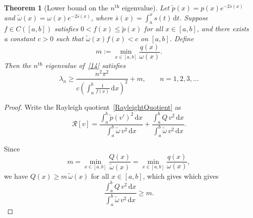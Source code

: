 \documentclass[11pt, reqno]{amsart}
\numberwithin{equation}{section}  %
\theoremstyle{plain}
\newtheorem{theorem}{Theorem}[section]
\theoremstyle{definition}
\theoremstyle{remark}
\begin{document}
\begin{theorem}[Lower bound on the $n^{\text{th}}$ eigenvalue]
\label{th:lower-bound}
Let $\tilde{p}(x) = p(x)e^{-2\bar{s}(x)}$ and $\tilde{\omega}(x) = \omega(x)e^{-2\bar{s}(x)}$, where $\bar{s}(x) = \int_a^x s(t)\,\mathrm{d}t$. Suppose $f \in C([a,b])$ satisfies $0 < f(x) \leq \tilde{p}(x)$ for all $x \in [a,b]$, and there exists a constant $c > 0$ such that $\tilde{\omega}(x)f(x) < c$ on $[a,b]$. Define
\[
m := \min_{x \in [a,b]} \frac{q(x)}{\omega(x)}.
\]
Then the $n^{\text{th}}$ eigenvalue of~\eqref{14} satisfies
\[
\lambda_n \geq \frac{n^2\pi^2}{c\left(\displaystyle\int_a^b \frac{1}{f(x)}\,\mathrm{d}x\right)^2} + m, \qquad n = 1, 2, 3, \ldots
\]
\end{theorem}

\begin{proof}
Write the Rayleigh quotient~\eqref{RayleightQuotient} as
\[
\mathcal{R}[v] = \frac{\displaystyle\int_a^b \tilde{p}(v')^2\,\mathrm{d}x}{\displaystyle\int_a^b \tilde{\omega}\,v^2\,\mathrm{d}x} + \frac{\displaystyle\int_a^b Q\,v^2\,\mathrm{d}x}{\displaystyle\int_a^b \tilde{\omega}\,v^2\,\mathrm{d}x}.
\]

Since 
\[
m = \min_{x \in [a,b]} \frac{Q(x)}{\tilde{\omega}(x)} = \min_{x \in [a,b]} \frac{q(x)}{\omega(x)},
\]
we have $Q(x) \geq m\,\tilde{\omega}(x)$ for all $x \in [a,b]$, which gives
which gives
\[
\frac{\displaystyle\int_a^b Q\,v^2\,\mathrm{d}x}{\displaystyle\int_a^b \tilde{\omega}\,v^2\,\mathrm{d}x} \geq m.
\]


\end{proof}
\end{document}
